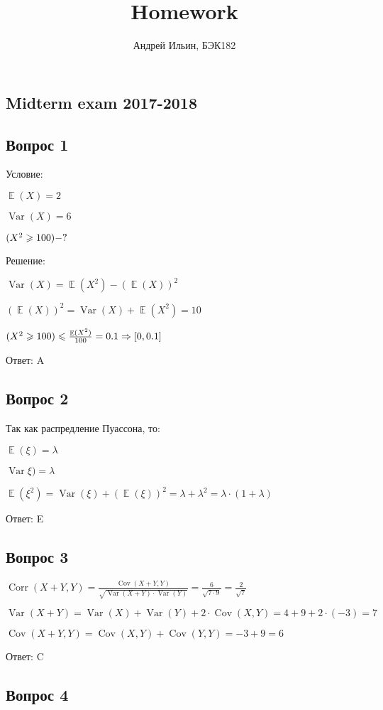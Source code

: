 \documentclass[a4paper]{article} %
\title{Homework}
\author{Андрей Ильин, БЭК182}
\DeclareMathOperator{\Var}{Var}
\DeclareMathOperator{\Cov}{Cov}
\DeclareMathOperator{\Corr}{Corr}
\DeclareMathOperator{\E}{\mathbb{E}}
\let\P\relax
\DeclareMathOperator{\P}{\mathbb{P}}
\renewcommand{\leq}{\leqslant}
\renewcommand{\geq}{\geqslant}
\begin{document}
\maketitle

\begin{flushleft}

\section{Midterm exam 2017-2018}

\subsection{Вопрос 1}

Условие:

$\E(X) = 2$

$\Var(X) = 6$

$\P(X^2 \geq 100) - ?$ 

Решение:

$\Var(X) = \E(X^2) - (\E(X))^2$

$(\E(X))^2 = \Var(X) + \E(X^2) = 10$

$\P(X^2 \geq 100) \leq \frac{\E(X^2)}{100} = 0.1  \Rightarrow [0, 0.1]$

Ответ: A

\subsection{Вопрос 2}

Так как распредление Пуассона, то:

$\E(\xi) =\lambda$

$\Var\xi) =\lambda$

$\E(\xi^2) = \Var(\xi) + (\E(\xi))^2 = \lambda + \lambda^2 = \lambda \cdot (1 + \lambda)$

Ответ: E

\subsection{Вопрос 3}

$\Corr(X+Y,Y) = \frac{\Cov(X+Y,Y)}{\sqrt{\Var(X+Y)\cdot \Var(Y)}} = \frac{6}{\sqrt{7\cdot 9}} = \frac{2}{\sqrt{7}}$

$\Var(X+Y) = \Var(X) + \Var(Y) + 2 \cdot \Cov(X,Y) = 4 + 9 + 2 \cdot (-3) = 7$

$\Cov(X+Y,Y) = \Cov(X,Y) + \Cov(Y,Y) = -3 + 9 = 6$

Ответ: C

\subsection{Вопрос 4}


\end{flushleft}
\end{document}
